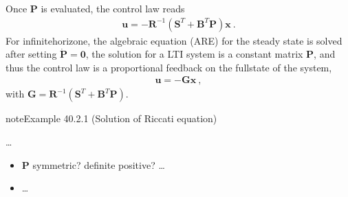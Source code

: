 \documentclass[letterpaper,10pt,english]{jupyterBook}
\begin{document}
\sphinxAtStartPar
Once \(\mathbf{P}\) is evaluated, the control law reads
\begin{equation*}
\begin{split}\mathbf{u} = - \mathbf{R}^{-1} \left( \mathbf{S}^T + \mathbf{B}^T \mathbf{P} \right) \mathbf{x} \ .\end{split}
\end{equation*}
\sphinxAtStartPar
For infinite\sphinxhyphen{}horizone, the algebraic equation (ARE) for the steady state is solved after setting \(\dot{\mathbf{P}} = \mathbf{0}\), the solution for a LTI system is a constant matrix \(\mathbf{P}\), and thus the control law is a proportional feedback on the full\sphinxhyphen{}state of the system,
\begin{equation*}
\begin{split}\mathbf{u} = - \mathbf{G} \mathbf{x} \ ,\end{split}
\end{equation*}
\sphinxAtStartPar
with \(\mathbf{G} = \mathbf{R}^{-1} \left( \mathbf{S}^T + \mathbf{B}^T \mathbf{P} \right)\).
\label{ch/control/optimal-control-full-state-old:control-optimal-riccati}
\begin{sphinxadmonition}{note}{Example 40.2.1 (Solution of Riccati equation)}



\sphinxAtStartPar
…
\end{sphinxadmonition}

\sphinxAtStartPar
{} 
\begin{itemize}
\item {} 
\sphinxAtStartPar
\(\mathbf{P}\) symmetric? definite positive? …

\item {} 
\sphinxAtStartPar
…

\end{itemize}

\sphinxstepscope
\end{document}
